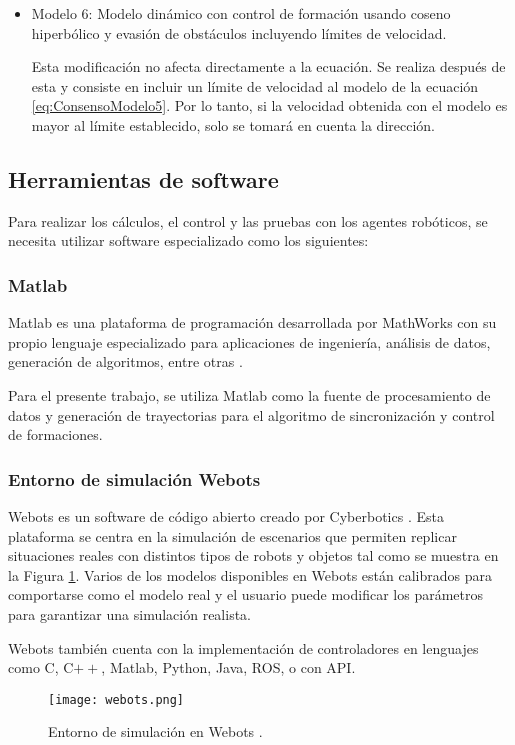 \begin{itemize}
	\item Modelo 6: Modelo dinámico con control de formación usando coseno hiperbólico y evasión de obstáculos incluyendo límites de velocidad.\par
	Esta modificación no afecta directamente a la ecuación. Se realiza después de esta y consiste en incluir un límite de velocidad al modelo de la ecuación \ref{eq:ConsensoModelo5}. Por lo tanto, si la velocidad obtenida con el modelo es mayor al límite establecido, solo se tomará en cuenta la dirección.
	
\end{itemize}

\subsection*{Herramientas de software}
Para realizar los cálculos, el control y las pruebas con los agentes robóticos, se necesita utilizar software especializado como los siguientes:

\subsubsection*{Matlab}
Matlab es una plataforma de programación desarrollada por MathWorks con su propio lenguaje especializado para aplicaciones de ingeniería, análisis de datos, generación de algoritmos, entre otras \cite{matlab}.

Para el presente trabajo, se utiliza Matlab como la fuente de procesamiento de datos y generación de trayectorias para el algoritmo de sincronización y control de formaciones.

\subsubsection*{Entorno de simulación Webots}
Webots es un software de código abierto creado por Cyberbotics \cite{webots}. Esta plataforma se centra en la simulación de escenarios que permiten replicar situaciones reales con distintos tipos de robots y objetos tal como se muestra en la Figura \ref{fig:webots}. Varios de los modelos disponibles en Webots están calibrados para comportarse como el modelo real y el usuario puede modificar los parámetros para garantizar una simulación realista.

 Webots también cuenta con la implementación de controladores en lenguajes como C, C$++$, Matlab, Python, Java, ROS, o con API.
 
 \begin{figure}[H]
 	\centering
 	\texttt{[image: webots.png]}
 	\caption{Entorno de simulación en Webots \cite{webots}.}
 	\label{fig:webots}
 \end{figure}

